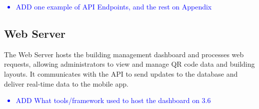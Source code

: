 \textcolor{blue}{
	\begin{itemize}
		\item ADD one example of API Endpoints, and the rest on Appendix 
\end{itemize}}

\subsection{Web Server}

The Web Server hosts the building management dashboard and processes web requests, allowing administrators to view and manage QR code data and building layouts. It communicates with the API to send updates to the database and deliver real-time data to the mobile app. 

\textcolor{blue}{
	\begin{itemize}
		\item ADD What tools/framework used to host the dashboard on 3.6
\end{itemize}}


